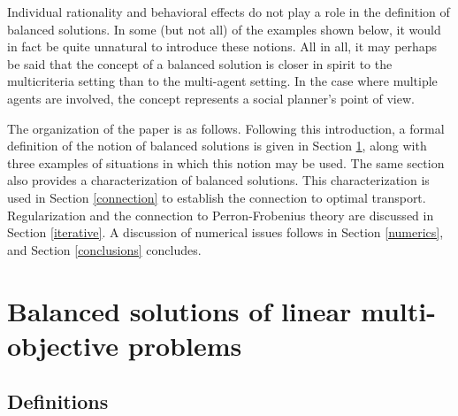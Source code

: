 \documentclass{article}
\theoremstyle{definition}
\begin{document}
Individual rationality and behavioral effects do not play a role in the definition of balanced solutions. In some (but not all) of the examples shown below, it would in fact be quite unnatural to introduce these notions. All in all, it may perhaps be said that the concept of a balanced solution is closer in spirit to the multicriteria setting than to the multi-agent setting. In the case where multiple agents are involved, the concept represents a social planner's  point of view.

The organization of the paper is as follows. Following this introduction, a formal definition of the notion of balanced solutions is given in Section \ref{sec_balanced}, along with three examples of situations in which this notion may be used. The same section also provides a characterization of balanced solutions. This characterization is used in Section \ref{connection} to establish the connection to optimal transport. Regularization and the connection to Perron-Frobenius theory are discussed in Section \ref{iterative}. A discussion
of numerical issues follows in Section \ref{numerics}, and Section \ref{conclusions} concludes.

\section{Balanced solutions of linear multi-objective problems} \label{sec_balanced}

\subsection{Definitions}
\end{document}
